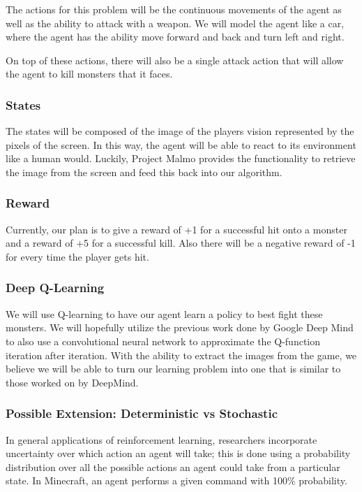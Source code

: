 \documentclass{article}
\begin{document}
The actions for this problem will be the continuous movements of the agent as well as the ability to attack with a weapon. We will model the agent like a car, where the agent has the ability move forward and back and  turn left and right.

On top of these actions, there will also be a single attack action that will allow the agent to kill monsters that it faces.


\subsubsection{States}

The states will be composed of the image of the players  vision represented by the pixels of the screen. In this way, the agent will be able  to react to its environment like a human would. Luckily, Project Malmo provides the functionality to retrieve the image from the screen and  feed this back into our algorithm.

\subsubsection{ Reward}

Currently,  our plan is to give a reward of +1 for a  successful hit onto a monster and a reward of +5 for a successful kill. Also there will be a negative reward of -1 for every time the player gets hit.

\subsubsection{Deep Q-Learning}

We will use Q-learning to  have our agent learn a policy to best fight these monsters.  We will hopefully utilize the previous work done by Google Deep Mind to also use a convolutional neural network to approximate the Q-function iteration after iteration.  With the ability to  extract the  images from the game, we believe we will be able to turn our learning problem into one that is similar to those worked on by DeepMind.

\subsubsection{Possible Extension: Deterministic vs Stochastic}

In general applications of reinforcement learning, researchers incorporate uncertainty over which action an agent will take; this is done using a probability distribution over all the possible actions an agent could take from a particular state. In Minecraft, an agent performs a given command with 100\% probability.
\end{document}
